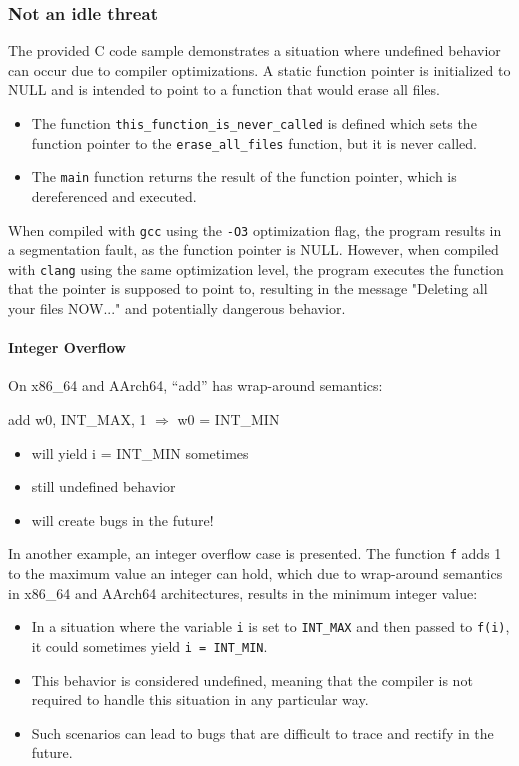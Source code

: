 \documentclass[12pt]{article}
\begin{document}
\subsubsection{Not an idle threat}

The provided C code sample demonstrates a situation where undefined behavior can occur due to compiler optimizations. A static function pointer is initialized to NULL and is intended to point to a function that would erase all files.

\begin{itemize}
    \item The function \texttt{this\_function\_is\_never\_called} is defined which sets the function pointer to the \texttt{erase\_all\_files} function, but it is never called.
    \item The \texttt{main} function returns the result of the function pointer, which is dereferenced and executed.
\end{itemize}

When compiled with \texttt{gcc} using the \texttt{-O3} optimization flag, the program results in a segmentation fault, as the function pointer is NULL. However, when compiled with \texttt{clang} using the same optimization level, the program executes the function that the pointer is supposed to point to, resulting in the message "Deleting all your files NOW..." and potentially dangerous behavior.

\paragraph{Integer Overflow}
On x86\_64 and AArch64, ``add'' has wrap-around semantics:

add w0, INT\_MAX, 1 $\Rightarrow$ w0 = INT\_MIN

\begin{itemize}
    \item will yield i = INT\_MIN sometimes
    \item still undefined behavior
    \item will create bugs in the future!
\end{itemize}

In another example, an integer overflow case is presented. The function \texttt{f} adds 1 to the maximum value an integer can hold, which due to wrap-around semantics in x86\_64 and AArch64 architectures, results in the minimum integer value:

\begin{itemize}
    \item In a situation where the variable \texttt{i} is set to \texttt{INT\_MAX} and then passed to \texttt{f(i)}, it could sometimes yield \texttt{i = INT\_MIN}.
    \item This behavior is considered undefined, meaning that the compiler is not required to handle this situation in any particular way.
    \item Such scenarios can lead to bugs that are difficult to trace and rectify in the future.
\end{itemize}
\end{document}
